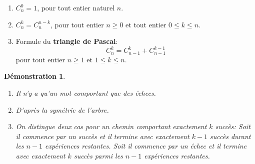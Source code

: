 \documentclass[a4paper,11pt]{article}
\theoremstyle{break}
\newcounter{enonce}
\newtheorem{demonstration}[enonce]{Démonstration}
\begin{document}
 \begin{proposition}
  \begin{enumerate}
   \item $C_n^0=1$, pour tout entier naturel $n$.
   \item $C_n^k=C_n^{n-k}$, pour tout entier $n \geq 0$ et tout entier $0\leq k \leq n$. 
   \item Formule du \textbf{triangle de Pascal}:
   $$C_n^k=C_{n-1}^k+C_{n-1}^{k-1}$$ pour tout entier $n \geq 1$ et $1 \leq k \leq n$.
  \end{enumerate}

 \end{proposition}

 

 \begin{demonstration}
 
 \begin{enumerate}
   \item Il n'y a qu'un mot comportant que des échecs.
   \item D'après la symétrie de l'arbre.
   \item On distingue deux cas pour un chemin comportant exactement $k$
   succès: Soit il commence par un succès et il termine avec exactement $k-1$ succès durant les
   $n-1$ expériences restantes. Soit il commence par un échec et il termine avec exactement $k$ succès
   parmi les $n-1$ expériences restantes. 
  \end{enumerate}
  
 \end{demonstration}




   
   
\end{document}
